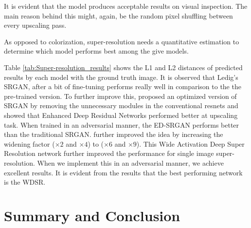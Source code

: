 \documentclass[oneside,a4paper,12pt]{report}
\begin{document}
It is evident that the model produces acceptable results on visual inspection. The main reason behind this might, again, be the random pixel shuffling between every upscaling pass. 

As opposed to colorization, super-resolution needs a quantitative estimation to determine which model performs best among the give models. 



\pagebreak
Table \ref{tab:Super-resolution_results} shows the L1 and L2 distances of predicted results by each model with the ground truth image. It is observed that Ledig's SRGAN, after a bit of fine-tuning performs really well in comparison to the the pre-trained version. To further improve this, \cite{lim2017enhanced} proposed an optimized version of SRGAN by removing the unnecessary modules in the conventional resnets and showed that Enhanced Deep Residual Networks performed better at upscaling task. When trained in an adversarial manner, the ED-SRGAN performs better than the traditional SRGAN. \cite{yu2018wide} further improved the idea by increasing the widening factor ($\times 2$ and $\times 4$) to ($\times 6$ and $\times 9$). This Wide Activation Deep Super Resolution network further improved the performance for single image super-resolution. When we implement this in an adversarial manner, we achieve excellent results. It is evident from the results that the best performing network is the WDSR.

\chapter{Summary and Conclusion}
\end{document}

